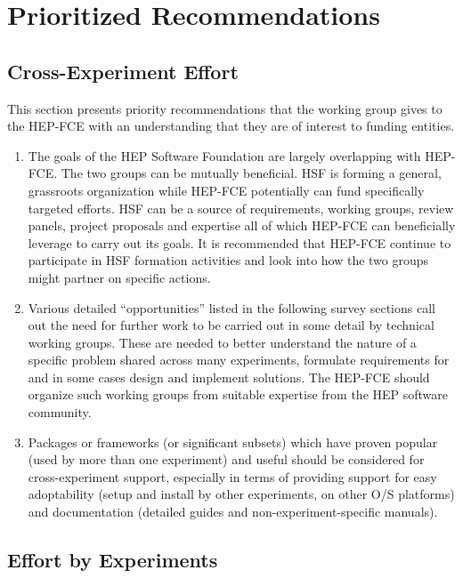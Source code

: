 \section{Prioritized Recommendations}

\subsection{Cross-Experiment Effort}

This section presents priority recommendations that the working group
gives to the HEP-FCE with an understanding that they are of interest
to funding entities.

\begin{enumerate}
\item The goals of the HEP Software Foundation are
  largely overlapping with HEP-FCE.  The two groups can be mutually
  beneficial.  HSF is forming a general, grassroots organization while
  HEP-FCE potentially can fund specifically targeted efforts.  HSF can
  be a source of requirements, working groups, review panels, project
  proposals and expertise all of which HEP-FCE can beneficially
  leverage to carry out its goals.  It is recommended that HEP-FCE
  continue to participate in HSF formation activities and look into
  how the two groups might partner on specific actions.

\item Various detailed ``opportunities'' listed in the following
  survey sections call out the need for further work to be carried out
  in some detail by technical working groups. These are needed to
  better understand the nature of a specific problem shared across
  many experiments, formulate requirements for and in some cases
  design and implement solutions.  The HEP-FCE should organize such
  working groups from suitable expertise from the HEP software community.

\item Packages or frameworks (or significant subsets) which have proven 
popular (used by more than one experiment) and useful should be considered for
cross-experiment support, especially in terms of providing support for
easy adoptability (setup and install by other experiments, on other 
O/S platforms) and documentation (detailed guides and non-experiment-specific manuals).

\end{enumerate}


\subsection{Effort by Experiments}

